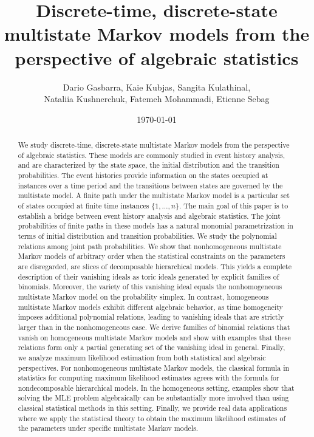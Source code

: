 \documentclass[11pt, a4paper]{article}
\title{Discrete-time, discrete-state  multistate Markov models from the perspective of algebraic statistics}
\author{Dario Gasbarra, Kaie Kubjas, Sangita Kulathinal,  \\ Nataliia Kushnerchuk, Fatemeh Mohammadi, Etienne Sebag}
\date{\today}
\numberwithin{equation}{section}
\theoremstyle{plain}
\theoremstyle{definition}
\begin{document}
\maketitle
\begin{abstract}
\noindent We study discrete-time, discrete-state multistate Markov models from the perspective of algebraic statistics. These models are commonly studied in event history analysis, and are characterized by the state space, the initial distribution and the transition probabilities. The event histories provide information on the states occupied at instances over a time period and the transitions between states are governed by the multistate model. A finite path  under the multistate Markov model is a particular set of states occupied at finite time instances $\{1, \dots, n\}$. The main goal of this paper is to establish a bridge between event history analysis and algebraic statistics. The joint probabilities of finite paths in these models has a natural monomial parametrization in terms
of initial distribution and transition probabilities. We study the polynomial relations among joint path probabilities. We show that nonhomogeneous multistate Markov models of arbitrary order when the statistical constraints on the parameters are disregarded, are slices of decomposable hierarchical models. This yields a complete description of their vanishing ideals as toric ideals generated by explicit families of binomials. Moreover, the variety of this vanishing ideal equals the nonhomogeneous multistate Markov model on the probability simplex. In contrast, homogeneous multistate Markov models exhibit different algebraic behavior, as time homogeneity imposes additional polynomial relations, leading to vanishing ideals that are strictly larger than in the nonhomogeneous case. We derive families of binomial relations that vanish on homogeneous multistate Markov models and show with examples that
these relations form only a partial generating set of the vanishing ideal in general. Finally, we analyze maximum likelihood estimation from both statistical and algebraic perspectives. For nonhomogeneous multistate Markov models, the classical formula in statistics for computing maximum likelihood estimates agrees with the formula for nondecomposable hierarchical models. In the homogeneous setting, examples show that solving the MLE problem algebraically can be substantially more involved than using classical statistical methods in this setting. Finally, we provide real data applications where we apply the statistical theory to obtain the maximum likelihood estimates of the parameters under specific multistate Markov models.
\end{abstract}
{
\hypersetup{
  linkcolor=black,
  citecolor=black,
  urlcolor=black
}
\tableofcontents
}
\end{document}
